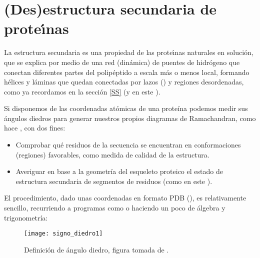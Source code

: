 \section{(Des)estructura secundaria de prote\'\i{}nas} \label{protSS}

La estructura secundaria es una propiedad de las prote\'\i{}nas naturales en soluci\'{o}n, 
que se explica por medio de una red (din\'{a}mica) de puentes de hidr\'{o}geno que conectan diferentes partes del polip\'{e}ptido 
a escala m\'{a}s o menos local, formando h\'{e}lices y l\'{a}minas que quedan conectadas por lazos () y regiones 
desordenadas, como ya recordamos en la secci\'{o}n \ref{SS} 
(y en este ). 

Si disponemos de las coordenadas at\'{o}micas de una prote\'{i}na podemos medir sus \'{a}ngulos diedros 
para generar nuestros propios diagramas de Ramachandran, como hace 
, con dos fines:
\begin{itemize}
\item Comprobar qu\'{e} residuos de la secuencia se encuentran en conformaciones (regiones) favorables, como medida de calidad
de la estructura. 
\item Averiguar en base a la geometr\'{i}a del esqueleto proteico el estado de estructura secundaria de segmentos de residuos
(como en este ). 
\end{itemize}

El procedimiento, dado unas coordenadas en formato PDB (),
es relativamente sencillo, recurriendo a programas como 
o haciendo un poco de \'{a}lgebra y trigonometr\'{i}a:


\begin{figure}
\begin{center} 
\texttt{[image: signo\_diedro1]}
\caption%
{
Definici\'{o}n de \'{a}ngulo diedro, 
figura tomada de .
}
\label{fig:signo_diedro1}
\end{center}
\end{figure}

